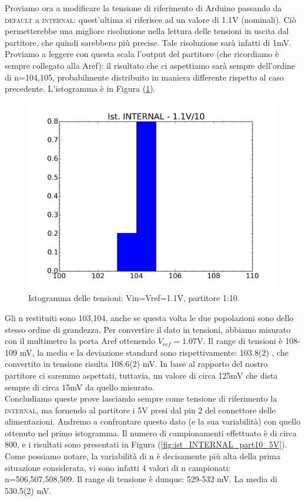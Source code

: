 \documentclass[journal, a4paper]{IEEEtran}
\begin{document}
Proviamo ora a modificare la tensione di riferimento di Arduino passando da \textsc{default} a \textsc{internal}: quest'ultima si riferisce ad un valore di 1.1V (nominali). Ciò permetterebbe una migliore risoluzione nella lettura delle tensioni in uscita dal partitore, che quindi sarebbero più precise. Tale risoluzione sarà infatti di 1mV. Proviamo a leggere con questa scala l'output del partitore (che ricordiamo è sempre collegato alla Aref): il risultato che ci aspettiamo sarà sempre dell'ordine di n={104,105}, probabilmente distribuito in maniera differente rispetto al caso precedente. L'istogramma è in Figura (\ref{fig:ist_INTERNAL_part10_1V}).\\

\begin{figure}
\centering
\includegraphics[width=0.9\linewidth]{./ist_INTERNAL_part10_1V}
\caption{Istogramma delle tensioni: Vin=Vref=1.1V, partitore 1:10.}
\label{fig:ist_INTERNAL_part10_1V}
\end{figure}

Gli n restituiti sono {103,104}, anche se questa volta le due popolazioni sono dello stesso ordine di grandezza. Per convertire il dato in tensioni, abbiamo misurato con il multimetro la porta Aref ottenendo $V_{ref} = 1.07$V. Il range di tensioni è 108-109 mV, la media e la deviazione standard sono rispettivamente: 103.8(2) , che convertito in tensione risulta 108.6(2) mV. In base al rapporto del nostro partitore ci saremmo aspettati, tuttavia, un valore di circa 125mV che dista sempre di circa 15mV da quello misurato.\\


Concludiamo queste prove lasciando sempre come tensione di riferimento la \textsc{internal}, ma fornendo al partitore i 5V presi dal pin 2 del connettore delle alimentazioni. Andremo a confrontare questo dato (e la sua variabilità) con quello ottenuto nel primo istogramma. Il numero di campionamenti effettuato è di circa 800, e i risultati sono presentati in Figura (\ref{fig:ist_INTERNAL_part10_5V}). Come possiamo notare, la variabilità di n è decisamente più alta della prima situazione considerata, vi sono infatti 4 valori di n campionati: n={506,507,508,509}. Il range di tensione è dunque: 529-532 mV. La media di 530.5(2) mV.
\end{document}
